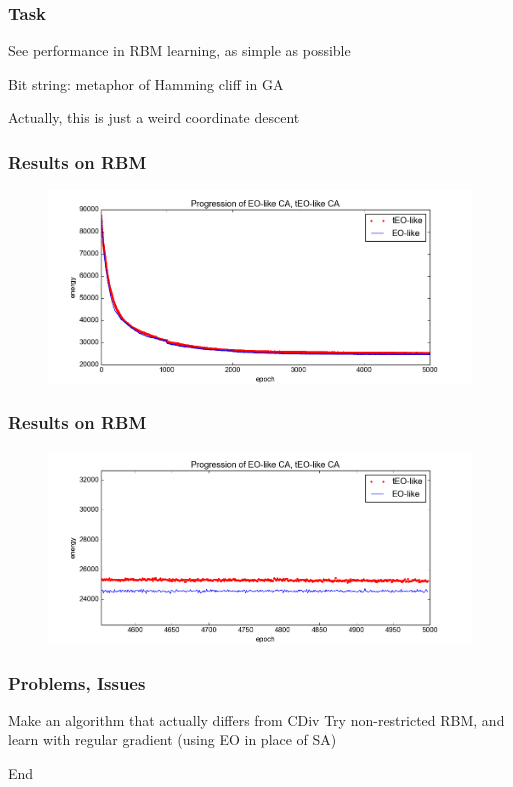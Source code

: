 \documentclass{beamer}
\begin{document}
\begin{frame}
  \frametitle{Task}
  See performance in RBM learning, as simple as possible

  Bit string: metaphor of Hamming cliff in GA

  Actually, this is just a weird coordinate descent
\end{frame}

\begin{frame}
  \frametitle{Results on RBM}
  \begin{figure}
    \includegraphics{eo_rbm_unzoomed}
  \end{figure}
\end{frame}

\begin{frame}
  \frametitle{Results on RBM}
  \begin{figure}
    \includegraphics{eo_rbm_zoomed}
  \end{figure}
\end{frame}

\begin{frame}
  \frametitle{Problems, Issues}
  Make an algorithm that actually differs from CDiv
  Try non-restricted RBM, and learn with regular gradient
  (using EO in place of SA)
\end{frame}

\begin{frame}
  End

\end{frame}
\end{document}
